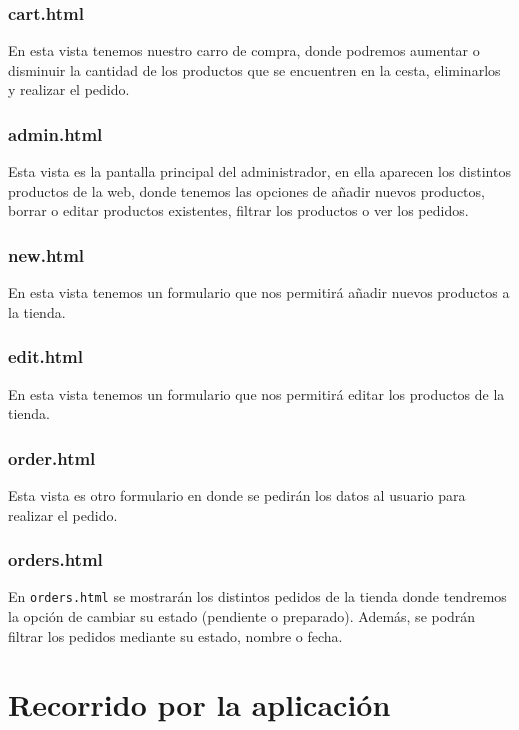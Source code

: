 \documentclass[12pt,a4paper,svgnames]{article}
\begin{document}
\subsubsection{cart.html}
En esta vista tenemos nuestro carro de compra, donde podremos aumentar o disminuir la cantidad de los productos que se encuentren en la cesta, eliminarlos y realizar el pedido.
\subsubsection{admin.html}
Esta vista es la pantalla principal del administrador, en ella aparecen los distintos productos de la web, donde tenemos las opciones de añadir nuevos productos, borrar o editar productos existentes, filtrar los productos o ver los pedidos.
\subsubsection{new.html}
En esta vista tenemos un formulario que nos permitirá añadir nuevos productos a la tienda.
\subsubsection{edit.html}
En esta vista tenemos un formulario que nos permitirá editar los productos de la tienda.
\subsubsection{order.html}
Esta vista es otro formulario en donde se pedirán los datos al usuario para realizar el pedido.
\subsubsection{orders.html}
En \texttt{orders.html} se mostrarán los distintos pedidos de la tienda donde tendremos la opción de cambiar su estado (pendiente o preparado). Además, se podrán filtrar los pedidos mediante su estado, nombre o fecha.

\clearpage

\section{Recorrido por la aplicación}
\end{document}
